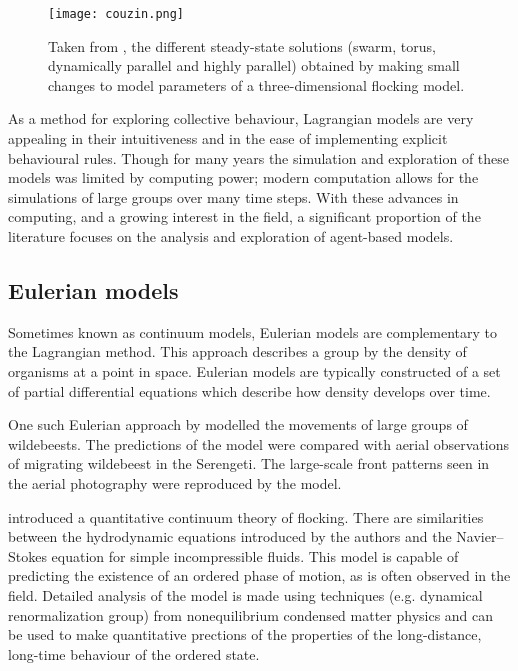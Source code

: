 \begin{figure}[t]
	\texttt{[image: couzin.png]}
	\caption{Taken from \citet{couzin02}, the different steady-state solutions (swarm, torus, dynamically parallel and highly parallel) obtained by making small changes to model parameters of a three-dimensional flocking model.}
	\label{fig:couzin}
\end{figure}

As a method for exploring collective behaviour, Lagrangian models are very appealing in their intuitiveness and in the ease of implementing explicit behavioural rules. Though for many years the simulation and exploration of these models was limited by computing power; modern computation allows for the simulations of large groups over many time steps. With these advances in computing, and a growing interest in the field, a significant proportion of the literature focuses on the analysis and exploration of agent-based models.

\subsection{Eulerian models}
\label{ssec:eulerian_models}

Sometimes known as continuum models, Eulerian models are complementary to the Lagrangian method. This approach describes a group by the density of organisms at a point in space. Eulerian models are typically constructed of a set of partial differential equations which describe how density develops over time.

One such Eulerian approach by \citet{gueron93} modelled the movements of large groups of wildebeests. The predictions of the model were compared with aerial observations of migrating wildebeest in the Serengeti. The large-scale front patterns seen in the aerial photography were reproduced by the model.

\citet{toner98} introduced a quantitative continuum theory of flocking. There are similarities between the hydrodynamic equations introduced by the authors and the Navier--Stokes equation for simple incompressible fluids. This model is capable of predicting the existence of an ordered phase of motion, as is often observed in the field. Detailed analysis of the model is made using techniques (e.g. dynamical renormalization group) from nonequilibrium condensed matter physics and can be used to make quantitative prections of the properties of the long-distance, long-time behaviour of the ordered state.

